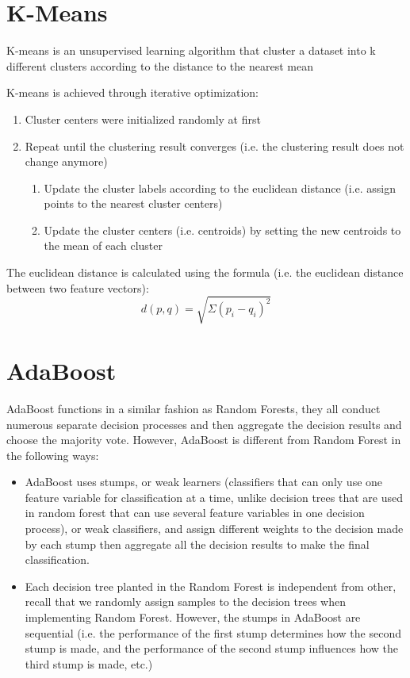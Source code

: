 \documentclass[12pt]{article}
\begin{document}
\section{K-Means}
K-means is an unsupervised learning algorithm that cluster a dataset into k different clusters according to the distance to the nearest mean

K-means is achieved through iterative optimization:
\begin{enumerate}
	\item Cluster centers were initialized randomly at first
	\item Repeat until the clustering result converges (i.e. the clustering result does not change anymore)
	\begin{enumerate}
		\item Update the cluster labels according to the euclidean distance (i.e. assign points to the nearest cluster centers)
		\item Update the cluster centers (i.e. centroids) by setting the new centroids to the mean of each cluster
    	\end{enumerate}
\end{enumerate}

The euclidean distance is calculated using the formula (i.e. the euclidean distance between two feature vectors):
$$d(p, q) = \sqrt{\Sigma(p_i - q_i)^2}$$
\newpage

\section{AdaBoost}
AdaBoost functions in a similar fashion as Random Forests, they all conduct numerous separate decision processes and then aggregate the decision results and choose the majority vote. However, AdaBoost is different from Random Forest in the following ways:
\begin{itemize}
	\item AdaBoost uses stumps, or weak learners (classifiers that can only use one feature variable for classification at a time, unlike decision trees that are used in random forest that can use several feature variables in one decision process), or weak classifiers, and assign different weights to the decision made by each stump then aggregate all the decision results to make the final classification.
	\item Each decision tree planted in the Random Forest is independent from other, recall that we randomly assign samples to the decision trees when implementing Random Forest. However, the stumps in AdaBoost are sequential (i.e. the performance of the first stump determines how the second stump is made, and the performance of the second stump influences how the third stump is made, etc.)
\end{itemize}
\end{document}
